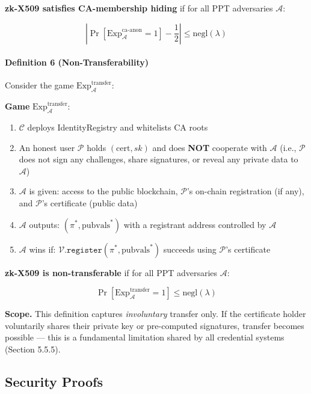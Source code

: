 \documentclass[11pt, a4paper]{article}
\begin{document}
\textbf{zk-X509 satisfies CA-membership hiding} if for all PPT
adversaries \(\mathcal{A}\):

\[\left| \Pr[\text{Exp}_{\mathcal{A}}^{\text{ca-anon}} = 1] - \frac{1}{2} \right| \leq \text{negl}(\lambda)\]

\paragraph{Definition 6
(Non-Transferability)}\label{definition-6-non-transferability}

Consider the game \(\text{Exp}_{\mathcal{A}}^{\text{transfer}}\):

\begin{mdframed}[linewidth=0.5pt, innertopmargin=6pt, innerbottommargin=6pt]
\small
\textbf{Game} $\text{Exp}_{\mathcal{A}}^{\text{transfer}}$:
\begin{enumerate}[nosep,leftmargin=1.5em]
\item $\mathcal{C}$ deploys IdentityRegistry and whitelists CA roots
\item An honest user $\mathcal{P}$ holds $(\text{cert}, sk)$ and does \textbf{NOT} cooperate with $\mathcal{A}$ (i.e., $\mathcal{P}$ does not sign any challenges, share signatures, or reveal any private data to $\mathcal{A}$)
\item $\mathcal{A}$ is given: access to the public blockchain, $\mathcal{P}$'s on-chain registration (if any), and $\mathcal{P}$'s certificate (public data)
\item $\mathcal{A}$ outputs: $(\pi^*, \text{pubvals}^*)$ with a registrant address controlled by $\mathcal{A}$
\item $\mathcal{A}$ wins if: $\mathcal{V}.\texttt{register}(\pi^*, \text{pubvals}^*)$ succeeds using $\mathcal{P}$'s certificate
\end{enumerate}
\end{mdframed}

\textbf{zk-X509 is non-transferable} if for all PPT adversaries
\(\mathcal{A}\):

\[\Pr[\text{Exp}_{\mathcal{A}}^{\text{transfer}} = 1] \leq \text{negl}(\lambda)\]

\textbf{Scope.} This definition captures \emph{involuntary} transfer
only. If the certificate holder voluntarily shares their private key or
pre-computed signatures, transfer becomes possible --- this is a
fundamental limitation shared by all credential systems (Section 5.5.5).

\subsection{Security Proofs}\label{security-proofs}
\end{document}
